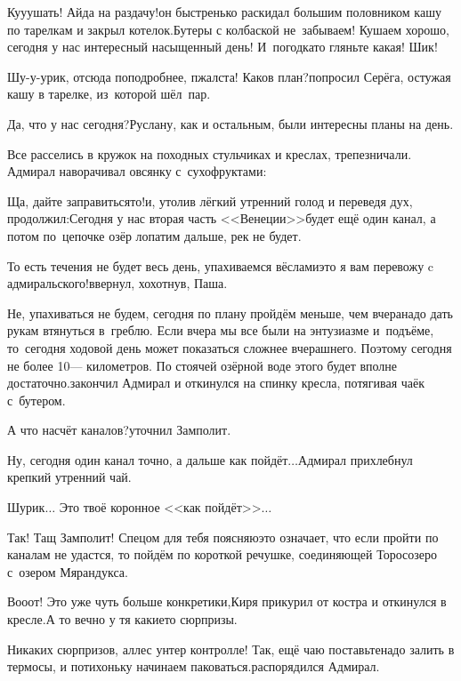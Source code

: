 \diagdash Ку\sdash у\sdash ушать! Айда на раздачу!\mdash он быстренько раскидал большим половником кашу по тарелкам и закрыл котелок.\mdash Бутеры с колбаской не~забываем! Кушаем хорошо, сегодня у нас интересный насыщенный день! И~погодка\sdash то гляньте какая! Шик!

\diagdash Шу-у-урик, отсюда поподробнее, п\sdash жалста! Каков план?\mdash попросил Серёга, остужая кашу в тарелке, из~которой шёл~пар.

\diagdash Да, что у нас сегодня?\mdash Руслану, как и остальным, были интересны планы на день.

Все расселись в кружок на походных стульчиках и креслах, трепезничали. Адмирал наворачивал овсянку с~сухофруктами:

\diagdash Ща, дайте заправиться\sdash то!\mdash и, утолив лёгкий утренний голод и переведя дух, продолжил:\mdash Сегодня у нас вторая часть <<Венеции>>\mdash будет ещё один канал, а потом по~цепочке озёр лопатим дальше, рек не будет.

\diagdash То есть течения не будет весь день, упахиваемся вёслами\mdash это я вам перевожу c адмиральского!\mdash ввернул, хохотнув, Паша.

\diagdash Не, упахиваться не будем, сегодня по плану пройдём меньше, чем вчера\mdash надо дать рукам втянуться в~греблю. Если вчера мы все были на энтузиазме и~подъёме, то~сегодня ходовой день может показаться сложнее вчерашнего. Поэтому сегодня не более 10\thinspace\nobreakdash--- километров. По стоячей озёрной воде этого будет вполне достаточно.\mdash закончил Адмирал и откинулся на спинку кресла, потягивая чаёк с~бутером.

\diagdash А что насчёт каналов?\mdash уточнил Замполит.

\diagdash Ну, сегодня один канал точно, а дальше как пойдёт$\ldots$\mdash Адмирал прихлебнул крепкий утренний чай.

\diagdash Шурик$\ldots$ Это твоё коронное <<как пойдёт>>$\ldots$

\diagdash Так! Тащ Замполит! Спецом для тебя поясняю\mdash это означает, что если пройти по каналам не удастся, то пойдём по короткой речушке, соединяющей Торосозеро с~озером Мярандукса.

\diagdash Во\sdash о\sdash от! Это уже чуть больше конкретики,\mdash Киря прикурил от костра и откинулся в кресле.\mdash А то вечно у тя какие\sdash то сюрпризы.

\diagdash Никаких сюрпризов, аллес унтер контролле! Так, ещё чаю поставьте\mdash надо залить в термосы, и потихоньку начинаем паковаться.\mdash распорядился Адмирал.

